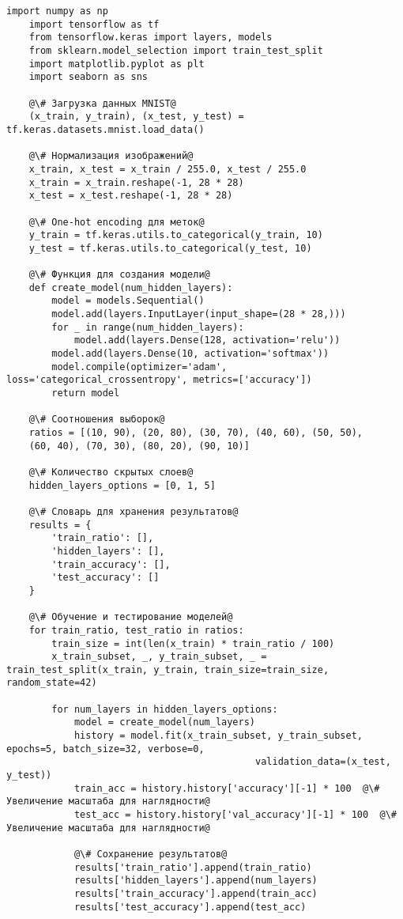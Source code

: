 \begin{lstlisting}[label=lst:1,caption=Нейросетевой алгоритм классификации данных из датасета MNIST]
	import numpy as np
	import tensorflow as tf
	from tensorflow.keras import layers, models
	from sklearn.model_selection import train_test_split
	import matplotlib.pyplot as plt
	import seaborn as sns
	
	@\# Загрузка данных MNIST@
	(x_train, y_train), (x_test, y_test) = tf.keras.datasets.mnist.load_data()
	
	@\# Нормализация изображений@
	x_train, x_test = x_train / 255.0, x_test / 255.0
	x_train = x_train.reshape(-1, 28 * 28)
	x_test = x_test.reshape(-1, 28 * 28)
	
	@\# One-hot encoding для меток@
	y_train = tf.keras.utils.to_categorical(y_train, 10)
	y_test = tf.keras.utils.to_categorical(y_test, 10)
	
	@\# Функция для создания модели@
	def create_model(num_hidden_layers):
		model = models.Sequential()
		model.add(layers.InputLayer(input_shape=(28 * 28,)))
		for _ in range(num_hidden_layers):
			model.add(layers.Dense(128, activation='relu'))
		model.add(layers.Dense(10, activation='softmax'))
		model.compile(optimizer='adam', loss='categorical_crossentropy', metrics=['accuracy'])
		return model
	
	@\# Соотношения выборок@
	ratios = [(10, 90), (20, 80), (30, 70), (40, 60), (50, 50),
	(60, 40), (70, 30), (80, 20), (90, 10)]
	
	@\# Количество скрытых слоев@
	hidden_layers_options = [0, 1, 5]
	
	@\# Словарь для хранения результатов@
	results = {
		'train_ratio': [],
		'hidden_layers': [],
		'train_accuracy': [],
		'test_accuracy': []
	}
	
	@\# Обучение и тестирование моделей@
	for train_ratio, test_ratio in ratios:
		train_size = int(len(x_train) * train_ratio / 100)
		x_train_subset, _, y_train_subset, _ = train_test_split(x_train, y_train, train_size=train_size, random_state=42)
		
		for num_layers in hidden_layers_options:
			model = create_model(num_layers)
			history = model.fit(x_train_subset, y_train_subset, epochs=5, batch_size=32, verbose=0,
											validation_data=(x_test, y_test))
			train_acc = history.history['accuracy'][-1] * 100  @\# Увеличение масштаба для наглядности@
			test_acc = history.history['val_accuracy'][-1] * 100  @\# Увеличение масштаба для наглядности@
			
			@\# Сохранение результатов@
			results['train_ratio'].append(train_ratio)
			results['hidden_layers'].append(num_layers)
			results['train_accuracy'].append(train_acc)
			results['test_accuracy'].append(test_acc)
\end{lstlisting}

\clearpage
